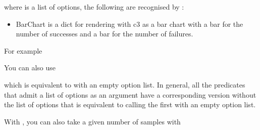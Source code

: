 \documentclass[letterpaper,10pt,english]{sphinxmanual}
\begin{document}
\sphinxAtStartPar
where  is a list of options, the following are recognised by :
\begin{itemize}
\item {} 
\sphinxAtStartPar
{} BarChart is a dict for rendering with c3 as a bar chart with a bar for the number of successes and a bar for the number of failures.

\end{itemize}

\sphinxAtStartPar
For example

\begin{sphinxVerbatim}[commandchars=\\\{\}]
 \PYG{p}{[}\PYG{p}{]}
\end{sphinxVerbatim}

\sphinxAtStartPar
You can also use

\begin{sphinxVerbatim}[commandchars=\\\{\}]
  
\end{sphinxVerbatim}

\sphinxAtStartPar
which is equivalent to  with an empty option list.
In general, all the predicates that admit a list of options as an argument have a corresponding version without the list of options that is equivalent to calling the first with an empty option list.

\sphinxAtStartPar
With , you can also take a given number of samples with

\begin{sphinxVerbatim}[commandchars=\\\{\}]
   
\end{sphinxVerbatim}
\end{document}
